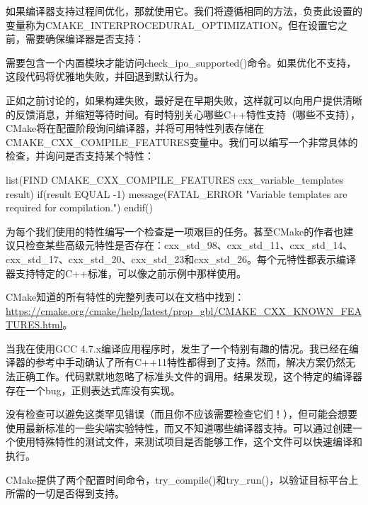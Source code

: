 如果编译器支持过程间优化，那就使用它。我们将遵循相同的方法，负责此设置的变量称为CMAKE\_INTERPROCEDURAL\_OPTIMIZATION。但在设置它之前，需要确保编译器是否支持：


需要包含一个内置模块才能访问check\_ipo\_supported()命令。如果优化不支持，这段代码将优雅地失败，并回退到默认行为。


正如之前讨论的，如果构建失败，最好是在早期失败，这样就可以向用户提供清晰的反馈消息，并缩短等待时间。有时特别关心哪些C++特性支持（哪些不支持），CMake将在配置阶段询问编译器，并将可用特性列表存储在CMAKE\_CXX\_COMPILE\_FEATURES变量中。我们可以编写一个非常具体的检查，并询问是否支持某个特性：


\begin{cmake}
list(FIND CMAKE_CXX_COMPILE_FEATURES cxx_variable_templates result)
if(result EQUAL -1)
    message(FATAL_ERROR "Variable templates are required for compilation.")
endif()
\end{cmake}

为每个我们使用的特性编写一个检查是一项艰巨的任务。甚至CMake的作者也建议只检查某些高级元特性是否存在：cxx\_std\_98、cxx\_std\_11、cxx\_std\_14、cxx\_std\_17、cxx\_std\_20、cxx\_std\_23和cxx\_std\_26。每个元特性都表示编译器支持特定的C++标准，可以像之前示例中那样使用。

CMake知道的所有特性的完整列表可以在文档中找到：\url{https://cmake.org/cmake/help/latest/prop_gbl/CMAKE_CXX_KNOWN_FEATURES.html}。


当我在使用GCC 4.7.x编译应用程序时，发生了一个特别有趣的情况。我已经在编译器的参考中手动确认了所有C++11特性都得到了支持。然而，解决方案仍然无法正确工作。代码默默地忽略了标准头文件的调用。结果发现，这个特定的编译器存在一个bug，正则表达式库没有实现。

没有检查可以避免这类罕见错误（而且你不应该需要检查它们！），但可能会想要使用最新标准的一些尖端实验特性，而又不知道哪些编译器支持。可以通过创建一个使用特殊特性的测试文件，来测试项目是否能够工作，这个文件可以快速编译和执行。

CMake提供了两个配置时间命令，try\_compile()和try\_run()，以验证目标平台上所需的一切是否得到支持。

